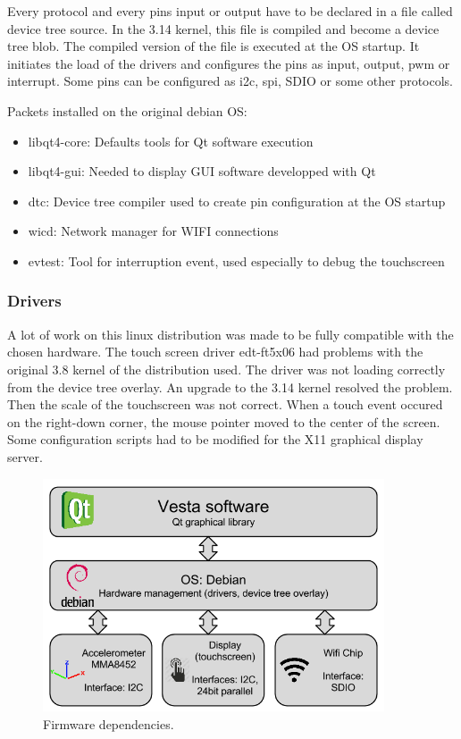 Every protocol and every pins input or output have to be declared in a file called device tree source. In the 3.14 kernel, this file is compiled and become a device tree blob. The compiled version of the file is executed at the OS startup. It initiates the load of the drivers and configures the pins as input, output, pwm or interrupt. Some pins can be configured as i2c, spi, SDIO or some other protocols.


Packets installed on the original debian OS:
\begin{itemize}
\item{libqt4-core: Defaults tools for Qt software execution}
\item{libqt4-gui: Needed to display GUI software developped with Qt}
\item{dtc: Device tree compiler used to create pin configuration at the OS startup}
\item{wicd: Network manager for WIFI connections}
\item{evtest: Tool for interruption event, used especially to debug the touchscreen}
\end{itemize}


\subsubsection{Drivers}
A lot of work on this linux distribution was made to be fully compatible with the chosen hardware.
The touch screen driver edt-ft5x06 had problems with the original 3.8 kernel of the distribution used. The driver was not loading correctly from the device tree overlay. An upgrade to the 3.14 kernel resolved the problem.
Then the scale of the touchscreen was not correct. 
When a touch event occured on the right-down corner, the mouse pointer moved to the center of the screen. Some configuration scripts had to be modified for the X11 graphical display server.

\begin{figure}[!htb]
    \centering
    \includegraphics[width=0.9\textwidth,keepaspectratio]{chap/softFig/first_diagram2}
    \caption{Firmware dependencies.}
    \label{fig:firmware dependencies}
\end{figure}

